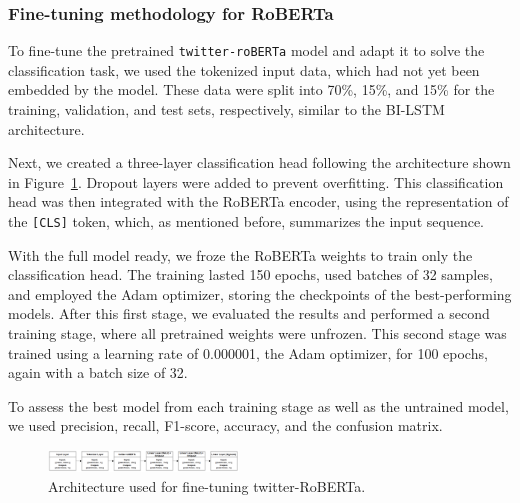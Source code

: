 \subsubsection{Fine-tuning methodology for RoBERTa}

To fine-tune the pretrained \texttt{twitter-roBERTa} model and adapt it to solve the classification task, we used the tokenized input data, which had not yet been embedded by the model. These data were split into 70\%, 15\%, and 15\% for the training, validation, and test sets, respectively, similar to the BI-LSTM architecture. 

Next, we created a three-layer classification head following the architecture shown in Figure~\ref{fig:roberta_finetune_architecture}. Dropout layers were added to prevent overfitting. This classification head was then integrated with the RoBERTa encoder, using the representation of the \texttt{[CLS]} token, which, as mentioned before, summarizes the input sequence.

With the full model ready, we froze the RoBERTa weights to train only the classification head. The training lasted 150 epochs, used batches of 32 samples, and employed the Adam optimizer, storing the checkpoints of the best-performing models. After this first stage, we evaluated the results and performed a second training stage, where all pretrained weights were unfrozen. This second stage was trained using a learning rate of 0.000001, the Adam optimizer, for 100 epochs, again with a batch size of 32.

To assess the best model from each training stage as well as the untrained model, we used precision, recall, F1-score, accuracy, and the confusion matrix.

\begin{figure}[htbp]
  \centering
  \includegraphics[width=0.45\textwidth]{images/roberta_finetune_architecture.png}
  \caption{Architecture used for fine-tuning twitter-RoBERTa.}
  \label{fig:roberta_finetune_architecture}
\end{figure}
